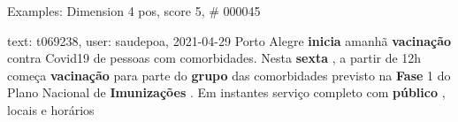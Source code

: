 \begin{frame}{Examples: Dimension 4 pos, score 5, \# 000045}
\footnotesize
\begin{exampleblock}{text: t069238, user: saudepoa, 2021-04-29}
 Porto Alegre \textbf{inicia} amanhã \textbf{vacinação} contra 
Covid19 de pessoas com comorbidades. Nesta \textbf{sexta} , a partir de 12h 
começa \textbf{vacinação} para parte do \textbf{grupo} das comorbidades 
previsto na \textbf{Fase} 1 do Plano Nacional de \textbf{Imunizações} . Em 
instantes serviço completo com \textbf{público} , locais e horários 
\end{exampleblock}
\end{frame}

